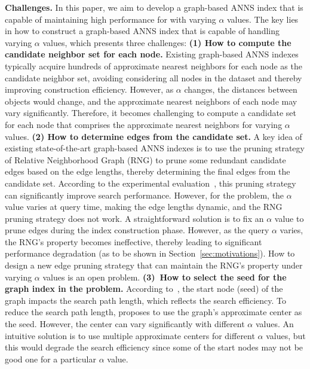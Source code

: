  
\noindent\textbf{Challenges.} In this {%
paper}, we aim to develop a graph-based ANNS index that is capable of maintaining high performance for \hvq with varying 
$\alpha$ values. %
The key lies in how to construct a graph-based ANNS index that is capable of handling varying $\alpha$ values, which presents three challenges: \textbf{(1) How to compute the candidate neighbor set for each node.} Existing graph-based ANNS indexes typically acquire hundreds of approximate nearest neighbors for each node as the candidate neighbor set, avoiding considering all nodes in the dataset and thereby improving construction efficiency. However, as $\alpha$ changes, the {\cheng distances between objects would change}, and the approximate nearest neighbors of each node may vary significantly. Therefore, it becomes challenging to compute a candidate set for each node that comprises the approximate nearest neighbors {\cheng for} varying $\alpha$ values. \textbf{(2) How to determine edges from the candidate set.} A key idea of existing state-of-the-art graph-based ANNS indexes is to use the pruning strategy of Relative Neighborhood Graph (RNG)
to prune some redundant candidate edges based on the edge lengths, thereby determining the final edges from the candidate set. According to the experimental evaluation~\cite{wang2021comprehensive}, this pruning strategy can significantly improve search performance. %
However, for the \hvq problem, the $\alpha$ value
varies at query time, making the edge lengths dynamic, and the RNG pruning strategy does not work. A straightforward solution is to fix an  $\alpha$ value to prune edges during the index construction phase. However, as the query $\alpha$ varies, the RNG's property becomes ineffective, thereby leading to significant performance degradation (as to be shown in Section~\ref{sec:motivations}). How to design a new edge pruning strategy that can maintain the RNG's property under varying $\alpha$ values is an open problem.
\textbf{(3)~How to select the seed for the graph index in the \hvq problem.}
According to~\cite{fu2019fast}, the start node (seed) of the graph impacts {%
the search path length, which reflects} the search efficiency. To reduce the search path length, \cite{fu2019fast} proposes {%
to use} the graph's approximate center as the seed. However, the center can vary significantly with different $\alpha$ values. 
An intuitive solution is to {%
use} multiple approximate centers for different $\alpha$ values, but this {%
would degrade the} search efficiency 
{\cheng since some of the start nodes may not be good one for a particular $\alpha$ value.}




